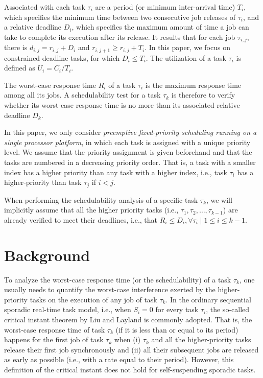 \documentclass[10pt,conference,preprint]{IEEEtran}
\begin{document}
Associated with each task $\tau_i$ are a period (or minimum inter-arrival time) $T_i$, which
specifies the minimum time between two consecutive job releases of
$\tau_i$, and a relative deadline $D_i$, which specifies the maximum
amount of time a job can take to complete its execution after its
release. It results that for each job $\tau_{i,j}$, there is $d_{i,j}=r_{i,j}+D_i$ and $r_{i,j+1} \geq r_{i,j} + T_i$. In this paper, we focus on constrained-deadline tasks, for which
$D_i \leq T_i$. The utilization of a task $\tau_i$ is defined as $U_i=C_i/T_i$. 

The worst-case response
time $R_i$ of a task $\tau_i$ is the maximum response time among all its
jobs. A schedulability test for a task $\tau_k$
is therefore to verify whether its worst-case response time is no more than its associated relative deadline $D_k$.

In this paper, we only consider \emph{preemptive fixed-priority scheduling running on a single processor platform}, in
which each task is assigned with a unique priority level. We assume
that the priority assignment is given beforehand and that the tasks are numbered in a decreasing priority order. That is, a task with a smaller index has a higher priority than any task with a higher index, i.e., task $\tau_i$ has a higher-priority than task $\tau_{j}$ if $i < j$. 

When performing the schedulability analysis of a specific task $\tau_k$, we will implicitly assume that all the higher priority tasks (i.e., $\tau_1, \tau_2, \ldots, \tau_{k-1}$) are already verified to meet their deadlines, i.e., that $R_i \leq D_i, \forall \tau_i \mid 1 \leq i \leq k-1$. 

\section{Background}
\label{sec:existing-analyses}

To analyze the worst-case response time (or the schedulability) of a task $\tau_k$, one usually needs to quantify the worst-case interference exerted by the higher-priority tasks on the execution of any job of task $\tau_k$. In the ordinary sequential sporadic real-time task model, i.e., when $S_i=0$ for every task $\tau_i$, the so-called critical instant theorem by Liu and Layland \cite{Liu_1973} is commonly adopted. That is, the worst-case response time of task $\tau_k$ (if it is less than or equal to its period) happens for the first job of task $\tau_k$ when (i) $\tau_k$ and all the higher-priority tasks release their first job synchronously and (ii) all their subsequent jobs are released as early as possible (i.e., with a rate equal to their period).  However,  this definition of the
critical instant does not hold for self-suspending sporadic tasks.  
\end{document}
